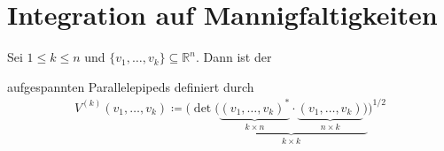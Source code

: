 \documentclass[a4paper,10pt]{scrbook}
\begin{document}
\section{Integration auf Mannigfaltigkeiten}
\addtocounter{thmn}{1}
\setcounter{theorem}{0}


\begin{theorem}[Definition] \label{thm:11.1}
  Sei $1 \leq k \leq n$ und $\{ v_1 ,\ldots, v_k \} \subseteq \mathbb{R}^n$. Dann ist der 

  aufgespannten Parallelepipeds definiert durch
  \begin{align*}
    V^{(k)}(v_1 ,\ldots, v_k) \coloneq
    \Bigg(
      \det
      \underbrace{\Bigg(
        \underbrace{(v_1 ,\ldots, v_k)^*}_{k \times n} \cdot \underbrace{(v_1 ,\ldots, v_k)}_{n \times k}
      \Bigg)}_{k \times k}
    \Bigg)^{1/2}
  \end{align*}
\end{theorem}
\end{document}
